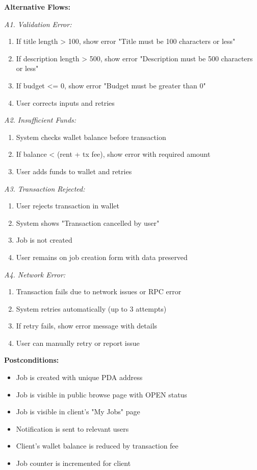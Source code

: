 \documentclass[a4paper,13pt,twoside]{report}
\theoremstyle{definition}
\begin{document}
\textbf{Alternative Flows:}

\textit{A1. Validation Error:}
\begin{enumerate}
    \item If title length > 100, show error "Title must be 100 characters or less"
    \item If description length > 500, show error "Description must be 500 characters or less"
    \item If budget <= 0, show error "Budget must be greater than 0"
    \item User corrects inputs and retries
\end{enumerate}

\textit{A2. Insufficient Funds:}
\begin{enumerate}
    \item System checks wallet balance before transaction
    \item If balance < (rent + tx fee), show error with required amount
    \item User adds funds to wallet and retries
\end{enumerate}

\textit{A3. Transaction Rejected:}
\begin{enumerate}
    \item User rejects transaction in wallet
    \item System shows "Transaction cancelled by user"
    \item Job is not created
    \item User remains on job creation form with data preserved
\end{enumerate}

\textit{A4. Network Error:}
\begin{enumerate}
    \item Transaction fails due to network issues or RPC error
    \item System retries automatically (up to 3 attempts)
    \item If retry fails, show error message with details
    \item User can manually retry or report issue
\end{enumerate}

\textbf{Postconditions:}
\begin{itemize}
    \item Job is created with unique PDA address
    \item Job is visible in public browse page with OPEN status
    \item Job is visible in client's "My Jobs" page
    \item Notification is sent to relevant users
    \item Client's wallet balance is reduced by transaction fee
    \item Job counter is incremented for client
\end{itemize}
\end{document}
